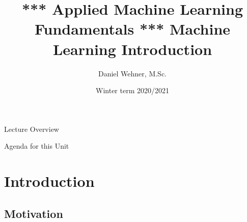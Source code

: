 


\title[Machine Learning Introduction]{*** Applied Machine Learning Fundamentals *** Machine Learning Introduction}
\author{Daniel Wehner, M.Sc.}
\date{Winter term 2020/2021}




\maketitlepage


\begin{frame}{Lecture Overview}{}
\end{frame}


\begin{frame}{Agenda for this Unit}
	\begin{multicols}{2}
		\tableofcontents
	\end{multicols}
\end{frame}


\section{Introduction}

\subsection{Motivation}

